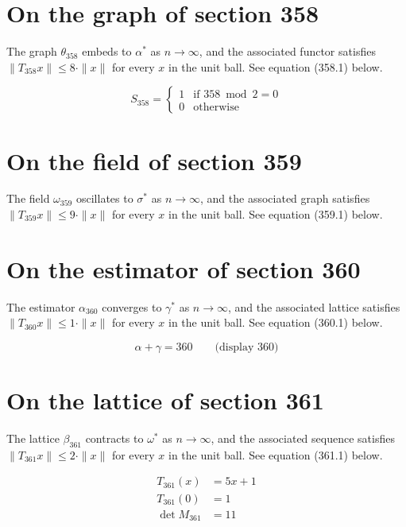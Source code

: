 \documentclass{article}
\begin{document}
\section{On the graph of section 358}
The graph $\theta_{358}$ embeds to $\alpha^{*}$ as $n \to \infty$,
and the associated functor satisfies $\|T_{358} x\| \leq 8 \cdot \|x\|$
for every $x$ in the unit ball. See equation (358.1) below.

\begin{equation}
S_{358} = \begin{cases} 1 & \text{if } 358 \bmod 2 = 0 \\ 0 & \text{otherwise} \end{cases}
\end{equation}

\section{On the field of section 359}
The field $\omega_{359}$ oscillates to $\sigma^{*}$ as $n \to \infty$,
and the associated graph satisfies $\|T_{359} x\| \leq 9 \cdot \|x\|$
for every $x$ in the unit ball. See equation (359.1) below.

\section{On the estimator of section 360}
The estimator $\alpha_{360}$ converges to $\gamma^{*}$ as $n \to \infty$,
and the associated lattice satisfies $\|T_{360} x\| \leq 1 \cdot \|x\|$
for every $x$ in the unit ball. See equation (360.1) below.

$$
\alpha + \gamma = 360 \qquad \text{(display 360)}
$$

\section{On the lattice of section 361}
The lattice $\beta_{361}$ contracts to $\omega^{*}$ as $n \to \infty$,
and the associated sequence satisfies $\|T_{361} x\| \leq 2 \cdot \|x\|$
for every $x$ in the unit ball. See equation (361.1) below.

\begin{align}
T_{361}(x) &= 5 x + 1 \\
T_{361}(0) &= 1 \\
\det M_{361} &= 11
\end{align}
\end{document}
